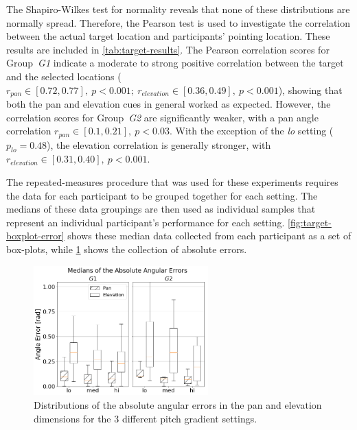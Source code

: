 \documentclass[acmsmall]{acmart}
\begin{document}
The Shapiro-Wilkes test for normality reveals that none of these distributions are normally spread. Therefore, the Pearson test is used to investigate the correlation between the actual target location and participants' pointing location.
These results are included in \cref{tab:target-results}.
The Pearson correlation scores for Group~\textit{G1} indicate a moderate to strong positive correlation between the target and the selected locations ($r_{pan} \in [0.72, 0.77],~p < 0.001;~r_{elevation} \in [0.36, 0.49],~p < 0.001$), showing that both the pan and elevation cues in general worked as expected.
However, the correlation scores for Group~\textit{G2} are significantly weaker, with a pan angle correlation $r_{pan} \in [0.1, 0.21],~p < 0.03$.
With the exception of the \textit{lo} setting ($p_{lo} = 0.48$), the elevation correlation is generally stronger, with $r_{elevation} \in [0.31, 0.40],~p < 0.001$.

The repeated-measures procedure that was used for these experiments requires the data for each participant to be grouped together for each setting.
The medians of these data groupings are then used as individual samples that represent an individual participant's performance for each setting.
\cref{fig:target-boxplot-error} shows these median data collected from each participant as a set of box-plots, while \cref{fig:target-boxplot-absolute-errors} shows the collection of absolute errors.

\begin{figure}
  \centering
  \includegraphics[width=0.6\textwidth]{figures/boxplot_target_search_absolute_median_error.png}
  \caption{Distributions of the absolute angular errors in the pan and elevation dimensions for the 3 different pitch gradient settings. }\label{fig:target-boxplot-absolute-errors}
\end{figure}
\end{document}
